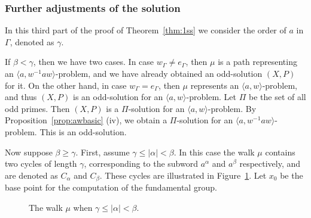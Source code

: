 \documentclass[10pt,a4paper]{amsart}
\theoremstyle{definition}
\theoremstyle{definition}
\numberwithin{equation}{section}
\begin{document}
\subsubsection{Further adjustments of the solution}

In this third part of the proof of Theorem~\ref{thm:1ss} we consider the order of $a$ in $\Gamma$, denoted as $\gamma$. 

If $\beta<\gamma$, then we have two cases. In case $w_\Gamma\neq e_\Gamma$, then $\mu$ is a path representing an $\langle a, w^{-1}aw\rangle$-problem, and we have already obtained an odd-solution $(X, P)$ for it. On the other hand, in case $w_\Gamma=e_\Gamma$, then $\mu$ represents an $\langle a, w\rangle$-problem, and thus $(X, P)$ is an odd-solution for an $\langle a, w\rangle$-problem. Let $\Pi$ be the set of all odd primes. Then $(X, P)$ is a $\Pi$-solution for an $\langle a, w\rangle$-problem. By Proposition~\ref{prop:awbasic} (iv), we obtain a $\Pi$-solution for an $\langle a, w^{-1}aw\rangle$-problem. This is an odd-solution. 

Now suppose $\beta\geq\gamma$. First, assume $\gamma\leq |\alpha|<\beta$. In this case the walk $\mu$ contains two cycles of length $\gamma$, corresponding to the subword $a^\alpha$ and $a^\beta$ respectively, and are denoted as $C_\alpha$ and $C_\beta$. These cycles are illustrated in Figure~\ref{fig:1ss1}. Let $x_0$ be the base point for the computation of the fundamental group. 

\begin{figure}[htbp]
\centering
\caption{\label{fig:1ss1} The walk $\mu$ when $\gamma\leq |\alpha|<\beta$.}
\end{figure}
\end{document}
